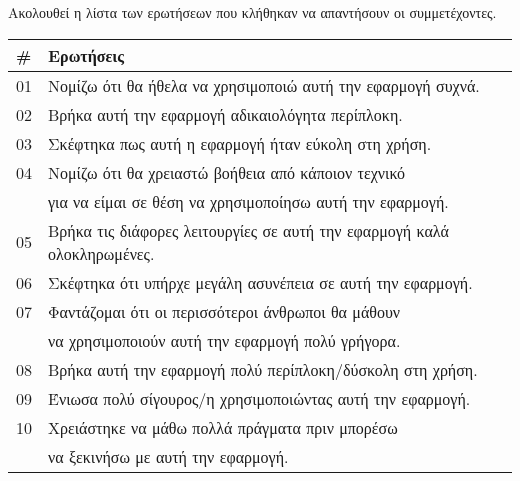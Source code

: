             Ακολουθεί η λίστα των ερωτήσεων που κλήθηκαν να απαντήσουν οι συμμετέχοντες.

            \begin{table}[H] \noindent\centering\small
                    \begin{tabular}{l|l}
                        \# & \textbf{Ερωτήσεις} \\
                        \midrule
                        01 & Νομίζω ότι θα ήθελα να χρησιμοποιώ αυτή την εφαρμογή συχνά. \\
                        \midrule
                        02 & Βρήκα αυτή την εφαρμογή αδικαιολόγητα περίπλοκη. \\
                        \midrule
                        03 & Σκέφτηκα πως αυτή η εφαρμογή ήταν εύκολη στη χρήση. \\
                        \midrule
                        04 & Νομίζω ότι θα χρειαστώ βοήθεια από κάποιον τεχνικό \\
                          & για να είμαι σε θέση να χρησιμοποίησω αυτή την εφαρμογή. \\
                        \midrule
                        05 & Βρήκα τις διάφορες λειτουργίες σε αυτή την εφαρμογή καλά ολοκληρωμένες. \\
                        \midrule
                        06 & Σκέφτηκα ότι υπήρχε μεγάλη ασυνέπεια σε αυτή την εφαρμογή. \\
                        \midrule
                        07 & Φαντάζομαι ότι οι περισσότεροι άνθρωποι θα μάθουν \\
                          & να χρησιμοποιούν αυτή την εφαρμογή πολύ γρήγορα. \\
                        \midrule
                        08 & Βρήκα αυτή την εφαρμογή πολύ περίπλοκη/δύσκολη στη χρήση. \\
                        \midrule
                        09 & Ένιωσα πολύ σίγουρος/η χρησιμοποιώντας αυτή την εφαρμογή. \\
                        \midrule
                        10 & Χρειάστηκε να μάθω πολλά πράγματα πριν μπορέσω \\
                           & να ξεκινήσω με αυτή την εφαρμογή. \\
                    \end{tabular}
            \end{table}


